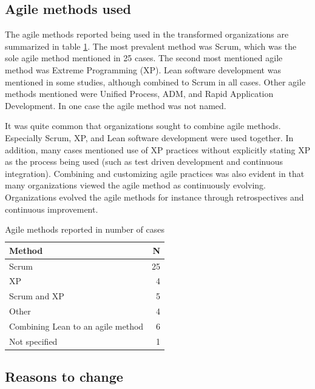 \documentclass[preprint,authoryear,12pt]{elsarticle}
\begin{document}
\subsection{Agile methods used}

The agile methods reported being used in the transformed organizations are
summarized in table \ref{table:agilemethods}. The most prevalent method was
Scrum, which was the sole agile method mentioned in 25 cases. The second most
mentioned agile method was Extreme Programming (XP). Lean software development
was mentioned in some studies, although combined to Scrum in all cases. Other
agile methods mentioned were Unified Process, ADM, and Rapid Application
Development. In one case the agile method was not named.

It was quite common that organizations sought to combine agile methods.
Especially Scrum, XP, and Lean software development were used together. In
addition, many cases mentioned use of XP practices without explicitly stating XP
as the process being used (such as test driven development and continuous
integration). Combining and customizing agile practices was also evident in that
many organizations viewed the agile method as continuously evolving.
Organizations evolved the agile methods for instance through retrospectives and
continuous improvement.

\begin{table}[h]
    \centering
    \begin{tabular}{ l r }
        \toprule
        Method                             &  N  \\
        \midrule
        Scrum                              &  25 \\
        XP                                 &  4  \\
        Scrum and XP                       &  5  \\
        Other                              &  4  \\
        Combining Lean to an agile method  &  6  \\
        Not specified                      &  1  \\
        \bottomrule
    \end{tabular}
    \caption{Agile methods reported in number of cases}
    \label{table:agilemethods}
\end{table}


\clearpage

\subsection{Reasons to change}
\end{document}
